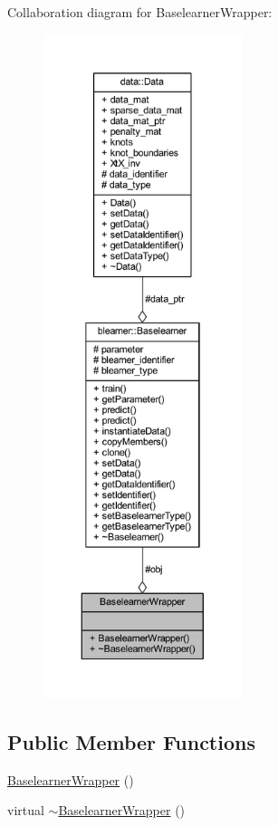 Collaboration diagram for Baselearner\+Wrapper\+:
\nopagebreak
\begin{figure}[H]
\begin{center}
\leavevmode
\includegraphics[height=550pt]{class_baselearner_wrapper__coll__graph}
\end{center}
\end{figure}
\subsection*{Public Member Functions}
\begin{DoxyCompactItemize}
\item 
\mbox{\hyperlink{class_baselearner_wrapper_a949efebe239360548b02a211b649d6d8}{Baselearner\+Wrapper}} ()
\item 
virtual \mbox{\hyperlink{class_baselearner_wrapper_a2dcf0b1a75179c3a2104b70138f88dc7}{$\sim$\+Baselearner\+Wrapper}} ()
\end{DoxyCompactItemize}
